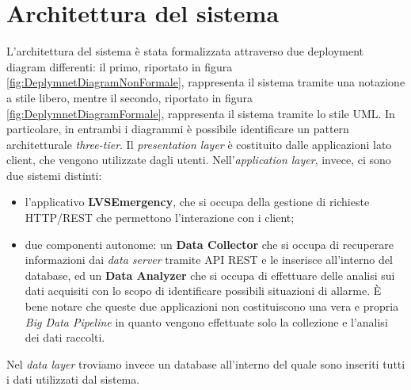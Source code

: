 \clearpage
\section{Architettura del sistema}
L'architettura del sistema è stata formalizzata attraverso due deployment diagram differenti: il primo, riportato in figura \ref{fig:DeplymnetDiagramNonFormale}, rappresenta il sistema tramite una notazione a stile libero, mentre il secondo, riportato in figura \ref{fig:DeplymnetDiagramFormale}, rappresenta il sistema tramite lo stile UML. In particolare, in entrambi i diagrammi è possibile identificare un pattern architetturale \textit{three-tier}. Il \textit{presentation layer} è costituito dalle applicazioni lato client, che vengono utilizzate dagli utenti. Nell'\textit{application layer}, invece, ci sono due sistemi distinti:

\begin{itemize}
	\item l'applicativo \textbf{LVSEmergency}, che si occupa della gestione di richieste HTTP/REST che permettono l'interazione con i client;
	\item due componenti autonome: un \textbf{Data Collector} che si occupa di recuperare informazioni dai \textit{data server} tramite API REST e le inserisce all'interno del database, ed un \textbf{Data Analyzer} che si occupa di effettuare delle analisi sui dati acquisiti con lo scopo di identificare possibili situazioni di allarme. È bene notare che queste due applicazioni non costituiscono una vera e propria \textit{Big Data Pipeline} in quanto vengono effettuate solo la collezione e l'analisi dei dati raccolti. 
\end{itemize}

Nel \textit{data layer} troviamo invece un database all'interno del quale sono inseriti tutti i dati utilizzati dal sistema.

